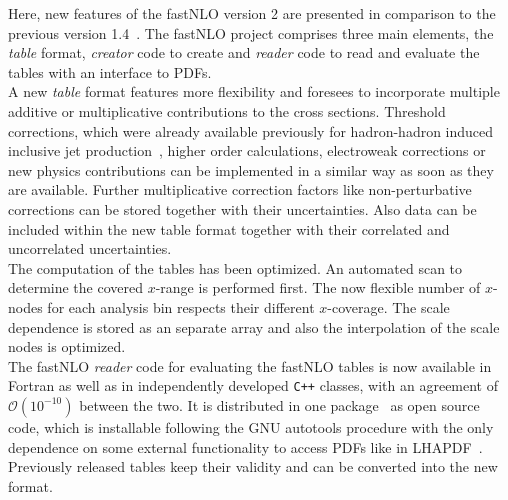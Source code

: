 \documentclass{DISproc}
\begin{document}
Here, new features of the fastNLO version 2 are presented in comparison to the previous version 1.4~\cite{Kluge:2006xs}.
The fastNLO project comprises three main elements, the \emph{table} format, \emph{creator} code to create and \emph{reader} code to read and evaluate the tables with an interface to PDFs. \\
A new \emph{table} format features more flexibility and foresees to incorporate multiple additive or multiplicative contributions to the cross sections.
Threshold corrections, which were already available previously for hadron-hadron induced inclusive jet production~\cite{Kidonakis:2000gi}, higher order calculations, electroweak corrections or new physics contributions can be implemented in a similar way as soon as they are available.
Further multiplicative correction factors like non-perturbative corrections can be stored together with their uncertainties.
Also data can be included within the new table format together with their correlated and uncorrelated uncertainties.\\
The computation of the tables has been optimized.
An automated scan to determine the covered $x$-range is performed first.
The now flexible number of $x$-nodes for each analysis bin respects their different $x$-coverage.
The scale dependence is stored as an separate array and also the interpolation of the scale nodes is optimized.\\
The fastNLO \emph{reader} code for evaluating the fastNLO tables is now available in Fortran as well as in independently developed \texttt{C++} classes, with an agreement of $\mathcal{O}(10^{-10})$ between the two.
It is distributed in one package~\cite{Fnlo:2012:Online} as open source code, which is installable following the GNU autotools procedure with the only dependence on some external functionality to access PDFs like in LHAPDF~\cite{Whalley:2005nh}.
Previously released tables keep their validity and can be converted into the new format.



\end{document}
